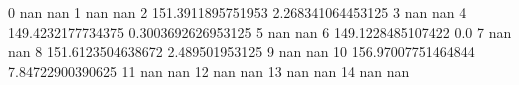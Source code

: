 0 nan nan
1 nan nan
2 151.3911895751953 2.268341064453125
3 nan nan
4 149.4232177734375 0.3003692626953125
5 nan nan
6 149.1228485107422 0.0
7 nan nan
8 151.6123504638672 2.489501953125
9 nan nan
10 156.97007751464844 7.84722900390625
11 nan nan
12 nan nan
13 nan nan
14 nan nan
